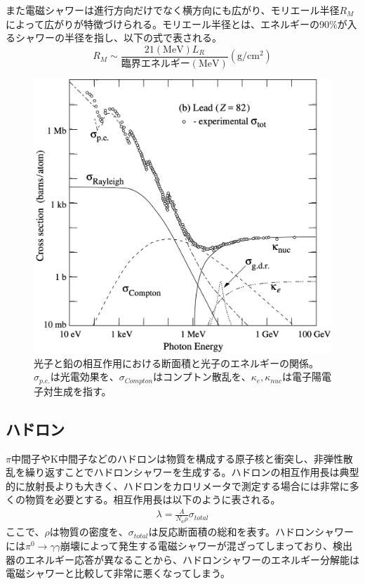 また電磁シャワーは進行方向だけでなく横方向にも広がり、モリエール半径$R_M$によって広がりが特徴づけられる。モリエール半径とは、エネルギーの90$\%$が入るシャワーの半径を指し、以下の式で表される。
\begin{equation}
 \label{moliere}
 R_M \sim \frac{21 (\mathrm{MeV}) L_R}{臨界エネルギー (\mathrm{MeV})}  (\mathrm{g}/\mathrm{{cm}^2})
\end{equation}
\begin{figure}[h]
	\begin{center}
 \includegraphics[keepaspectratio, scale=0.4]
 	{Figure/Siwecal/photon_crosssection.png}
 		\caption[光子と鉛の相互作用における断面積と光子のエネルギー]{光子と鉛の相互作用における断面積と光子のエネルギーの関係。${\sigma}_{p.e.}$は光電効果を、${\sigma}_{Compton}$はコンプトン散乱を、${\kappa}_{e}, {\kappa}_{nuc}$は電子陽電子対生成を指す。\cite{blue}}
 		\label{photon_cs}
	\end{center}
 \end{figure}
\subsection{ハドロン}
$\pi$中間子やK中間子などのハドロンは物質を構成する原子核と衝突し、非弾性散乱を繰り返すことでハドロンシャワーを生成する。ハドロンの相互作用長は典型的に放射長よりも大きく、ハドロンをカロリメータで測定する場合には非常に多くの物質を必要とする。相互作用長は以下のように表される。
\begin{align}
\lambda = \frac{A}{N_a \rho} \sigma_{total}
\end{align}
ここで、$\rho$は物質の密度を、$ \sigma_{total}$は反応断面積の総和を表す。ハドロンシャワーには${\pi}^0 \rightarrow \gamma \gamma$崩壊によって発生する電磁シャワーが混ざってしまっており、検出器のエネルギー応答が異なることから、ハドロンシャワーのエネルギー分解能は電磁シャワーと比較して非常に悪くなってしまう。

